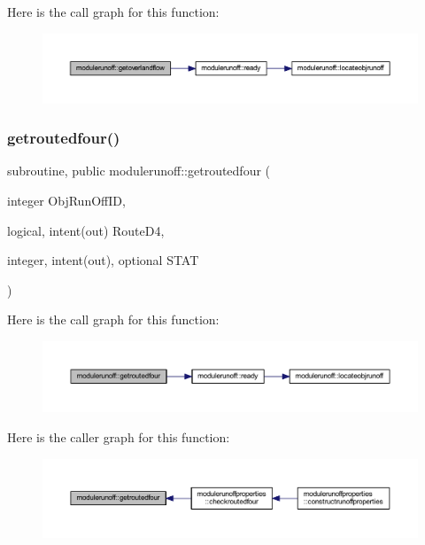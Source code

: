 Here is the call graph for this function\+:
\nopagebreak
\begin{figure}[H]
\begin{center}
\leavevmode
\includegraphics[width=350pt]{namespacemodulerunoff_a4d5da3ce5f5efddf1d2957ea8e1e1791_cgraph}
\end{center}
\end{figure}
\mbox{\label{namespacemodulerunoff_a092094d64e7a0ff361f536ab75f67317}} 
\subsubsection{\texorpdfstring{getroutedfour()}{getroutedfour()}}
{\footnotesize\ttfamily subroutine, public modulerunoff\+::getroutedfour (\begin{DoxyParamCaption}\item[{integer}]{Obj\+Run\+Off\+ID,  }\item[{logical, intent(out)}]{Route\+D4,  }\item[{integer, intent(out), optional}]{S\+T\+AT }\end{DoxyParamCaption})}

Here is the call graph for this function\+:
\nopagebreak
\begin{figure}[H]
\begin{center}
\leavevmode
\includegraphics[width=350pt]{namespacemodulerunoff_a092094d64e7a0ff361f536ab75f67317_cgraph}
\end{center}
\end{figure}
Here is the caller graph for this function\+:
\nopagebreak
\begin{figure}[H]
\begin{center}
\leavevmode
\includegraphics[width=350pt]{namespacemodulerunoff_a092094d64e7a0ff361f536ab75f67317_icgraph}
\end{center}
\end{figure}
\mbox{\label{namespacemodulerunoff_ad1eea51d0c7cb95a4e235e18dad99861}} 
